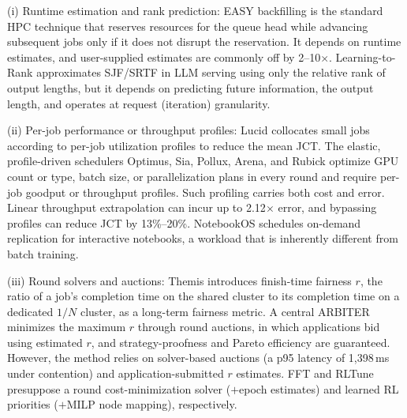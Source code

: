\documentclass{ieeetj}
\begin{document}
(i) Runtime estimation and rank prediction: EASY backfilling\cite{mualem2001backfilling} is the standard HPC technique that reserves resources for the queue head while advancing subsequent jobs only if it does not disrupt the reservation. It depends on runtime estimates, and user-supplied estimates are commonly off by 2–10$\times$. Learning-to-Rank\cite{fu2024efficient} approximates SJF/SRTF in LLM serving using only the relative rank of output lengths, but it depends on predicting future information, the output length, and operates at request (iteration) granularity.

(ii) Per-job performance or throughput profiles: Lucid\cite{b5} collocates small jobs according to per-job utilization profiles to reduce the mean JCT. The elastic, profile-driven schedulers Optimus\cite{peng2018optimus}, Sia\cite{b4}, Pollux\cite{qiao2021pollux}, Arena\cite{arena2026}, and Rubick\cite{rubick2025} optimize GPU count or type, batch size, or parallelization plans in every round and require per-job goodput or throughput profiles. Such profiling carries both cost and error. Linear throughput extrapolation can incur up to 2.12$\times$ error, and bypassing profiles can reduce JCT by 13\%--20\%\cite{schedmate2025}. NotebookOS\cite{notebookos2026} schedules on-demand replication for interactive notebooks, a workload that is inherently different from batch training.

(iii) Round solvers and auctions: Themis\cite{mahajan2020themis} introduces finish-time fairness $r$, the ratio of a job's completion time on the shared cluster to its completion time on a dedicated $1/N$ cluster, as a long-term fairness metric. A central ARBITER minimizes the maximum $r$ through round auctions, in which applications bid using estimated $r$, and strategy-proofness and Pareto efficiency are guaranteed. However, the method relies on solver-based auctions (a p95 latency of 1,398\,ms under contention) and application-submitted $r$ estimates. FFT\cite{fft2025} and RLTune\cite{rltune2025} presuppose a round cost-minimization solver ($+$epoch estimates) and learned RL priorities ($+$MILP node mapping), respectively.
\end{document}
